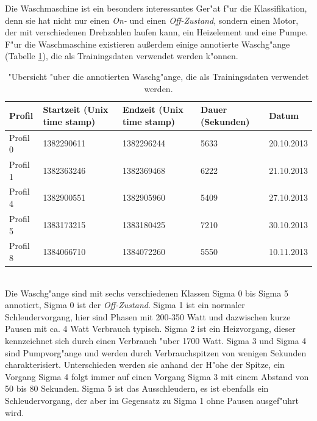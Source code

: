 Die Waschmaschine ist ein besonders interessantes Ger"at f"ur die Klassifikation, denn sie hat nicht nur einen \textit{On-} und einen \textit{Off-Zustand}, sondern einen Motor, der mit verschiedenen Drehzahlen laufen kann, ein Heizelement und eine Pumpe. F"ur die Waschmaschine existieren au{\ss}erdem einige annotierte Waschg"ange (Tabelle \ref{profile01458}), die als Trainingsdaten verwendet werden k"onnen.\\
\begin{table}[h]
\begin{tabular}{l|p{3.5cm}|p{3.5cm}|l|l}
Profil & Startzeit \newline (Unix time stamp) & Endzeit \newline (Unix time stamp) & Dauer (Sekunden) & Datum \\
\hline
Profil 0 & 1382290611 & 1382296244 & 5633 & 20.10.2013 \\
Profil 1 & 1382363246 & 1382369468 & 6222 & 21.10.2013 \\
Profil 4 & 1382900551 & 1382905960 & 5409 & 27.10.2013 \\
Profil 5 & 1383173215 & 1383180425 & 7210 & 30.10.2013 \\
Profil 8 & 1384066710 & 1384072260 & 5550 & 10.11.2013
\end{tabular}
\caption["Ubersicht Trainingsdaten]{"Ubersicht "uber die annotierten Waschg"ange, die als Trainingsdaten verwendet werden.}
\label{profile01458}
\end{table}\\
Die Waschg"ange sind mit sechs verschiedenen Klassen Sigma 0 bis Sigma 5 annotiert, Sigma 0 ist der \textit{Off-Zustand}. Sigma 1 ist ein normaler Schleudervorgang, hier sind Phasen mit 200-350 Watt und dazwischen kurze Pausen mit ca. 4 Watt Verbrauch typisch.
Sigma 2 ist ein Heizvorgang, dieser kennzeichnet sich durch einen Verbrauch "uber 1700 Watt.
Sigma 3 und Sigma 4 sind Pumpvorg"ange und werden durch Verbrauchspitzen von wenigen Sekunden charakterisiert. Unterschieden werden sie anhand der H"ohe der Spitze, ein Vorgang Sigma 4 folgt immer auf einen Vorgang Sigma 3 mit einem Abstand von 50 bis 80 Sekunden.
Sigma 5 ist das Ausschleudern, es ist ebenfalls ein Schleudervorgang, der aber im Gegensatz zu Sigma 1 ohne Pausen ausgef"uhrt wird. \\

